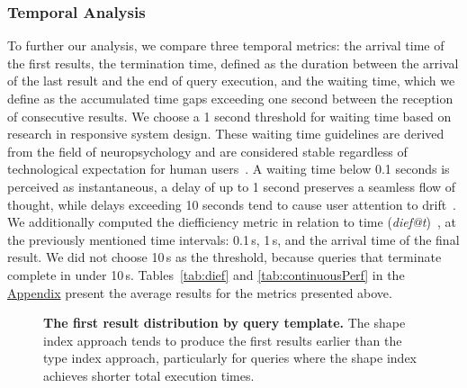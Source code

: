  

\subsubsection{Temporal Analysis}
To further our analysis, we compare three temporal metrics: the arrival time of the first results, the termination time, defined as the duration between the arrival of the last result and the end of query execution, and the waiting time, which we define as the accumulated time gaps exceeding one second between the reception of consecutive results.
We choose a 1 second threshold for waiting time based on research in responsive system design.
These waiting time guidelines are derived from the field of neuropsychology and are considered stable regardless of technological expectation for human users~\cite{uxtigersNeedSpeed, Nielsen1993}.
A waiting time below 0.1 seconds is perceived as instantaneous, a delay of up to 1 second preserves a seamless flow of thought, while delays exceeding 10 seconds tend to cause user attention to drift~\cite{Nielsen1993}.
We additionally computed the diefficiency metric in relation to time (\textit{dief@t})~\cite{Acosta2017}, at the previously mentioned time intervals: 0.1\,s, 1\,s, and the arrival time of the final result.
We did not choose 10\,s as the threshold, because queries that terminate complete in under 10\,s.
Tables~\ref{tab:dief} and \ref{tab:continuousPerf} in the \hyperref[sec:appendix]{Appendix} present the average results for the metrics presented above.

\begin{figure}
    \centering
    
    \caption{
    \textbf{The first result distribution by query template.}    
    The shape index approach tends to produce the first results earlier than the type index approach, particularly for queries where the shape index achieves shorter total execution times.}
    \label{fig:first_res}
\end{figure}

